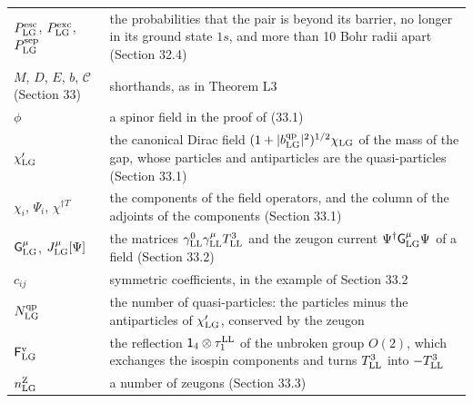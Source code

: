 \documentclass[
  10pt,
]{article}
\begin{document}
\begin{longtable}[]{@{}
  >{\raggedright\arraybackslash}p{}
  >{\raggedright\arraybackslash}p{}@{}}
\(P^{\rm esc}_{\rm LG}\), \(P^{\rm exc}_{\rm LG}\),
\(P^{\rm sep}_{\rm LG}\) & the probabilities that the pair is beyond its
barrier, no longer in its ground state \(1s\), and more than 10 Bohr
radii apart (Section 32.4) \\
\(M\), \(D\), \(E\), \(b\), \(\mathcal C\) (Section 33) & shorthands, as
in Theorem L3 \\
\(\phi\) & a spinor field in the proof of (33.1) \\
\(\chi'_{\rm LG}\) & the canonical Dirac field
\((1+\lvert b^{\rm qp}_{\rm LG}\rvert^2)^{1/2}\chi_{\rm LG}\) of the
mass of the gap, whose particles and antiparticles are the
quasi-particles (Section 33.1) \\
\(\chi_i\), \(\Psi_i\), \(\chi^{\dagger T}\) & the components of the
field operators, and the column of the adjoints of the components
(Section 33.1) \\
\(\mathsf G^\mu_{\rm LG}\), \(J^\mu_{\rm LG}[\Psi]\) & the matrices
\(\gamma^0_{\rm LL}\gamma^\mu_{\rm LL}T^3_{\rm LL}\) and the zeugon
current \(\Psi^\dagger\mathsf G^\mu_{\rm LG}\Psi\) of a field (Section
33.2) \\
\(c_{ij}\) & symmetric coefficients, in the example of Section 33.2 \\
\(N^{\rm qp}_{\rm LG}\) & the number of quasi-particles: the particles
minus the antiparticles of \(\chi'_{\rm LG}\), conserved by the
zeugon \\
\(\mathsf F^{\rm v}_{\rm LG}\) & the reflection
\(\mathsf 1_4\otimes\tau^{\rm LL}_1\) of the unbroken group \(O(2)\),
which exchanges the isospin components and turns \(T^3_{\rm LL}\) into
\(-T^3_{\rm LL}\) \\
\(n^{\rm Z}_{\rm LG}\) & a number of zeugons (Section 33.3) \\
\end{longtable}
\end{document}
